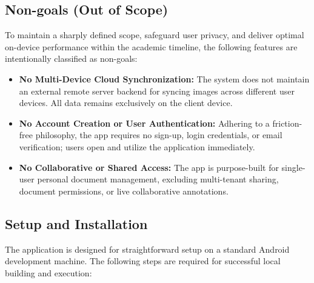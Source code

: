 \subsection{Non-goals (Out of Scope)}
To maintain a sharply defined scope, safeguard user privacy, and deliver optimal on-device performance within the academic timeline, the following features are intentionally classified as non-goals:
\begin{itemize}
    \item \textbf{No Multi-Device Cloud Synchronization:} The system does not maintain an external remote server backend for syncing images across different user devices. All data remains exclusively on the client device.
    \item \textbf{No Account Creation or User Authentication:} Adhering to a friction-free philosophy, the app requires no sign-up, login credentials, or email verification; users open and utilize the application immediately.
    \item \textbf{No Collaborative or Shared Access:} The app is purpose-built for single-user personal document management, excluding multi-tenant sharing, document permissions, or live collaborative annotations.
\end{itemize}

\subsection{Setup and Installation}
The application is designed for straightforward setup on a standard Android development machine. The following steps are required for successful local building and execution:

